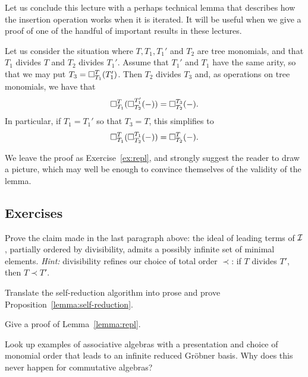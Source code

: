 Let us conclude this lecture with a perhaps technical
lemma that describes how the insertion operation
works when it is iterated. It will be useful when we
give a proof of one of the handful of important results 
in these lectures.

\begin{lemma}\label{lemma:repl}
Let us consider the situation where $T,T_1,T_1'$ and $T_2$ 
are tree monomials, and that $T_1$ divides $T$ and
$T_2$ divides $T_1'$. Assume that $T_1'$ and $T_1$ have
the same arity, so that we may put $T_3 = \square_{T_1}^{T}(T_1')$.
Then $T_2$ divides $T_3$ and, as operations on tree monomials,
we have that
\[ 
\square_{T_1}^{T}(\square_{T_2}^{T_1'}(-))= 
 	\square_{T_2}^{T_3}(-).
\]
In particular, if $T_1=T_1'$ so that $T_3 = T$, this
simplifies to 
\[ 
\square_{T_1}^{T}(\square_{T_2}^{T_1}(-))= 
 	\square_{T_2}^{T}(-).
\]
\end{lemma}

We leave the proof as Exercise~\ref{ex:repl}, and
strongly suggest the reader to draw a picture, which
may well be enough to convince themselves of the
validity of the lemma. 

\subsection{Exercises}

\begin{question}
Prove the claim made in the last paragraph above:
the ideal of leading terms of $\mathcal{I}$, partially ordered by
divisibility, admits a possibly infinite set of
minimal elements. \emph{Hint:} divisibility
refines our choice of total order $\prec$: if 
$T$ divides $T'$, then $T\prec T'$. 
\end{question}

\begin{question}\label{ex:self-reduction}
Translate the self-reduction algorithm into prose
and prove Proposition~\ref{lemma:self-reduction}.
\end{question}

\begin{question}\label{ex:repl}
Give a proof of Lemma~\ref{lemma:repl}.
\end{question}

\begin{question}
Look up examples
of associative algebras
with a presentation and choice
of monomial order that leads to
an infinite reduced Gr\"obner
basis. Why does this never happen
for commutative algebras?
\end{question}
\vfill

